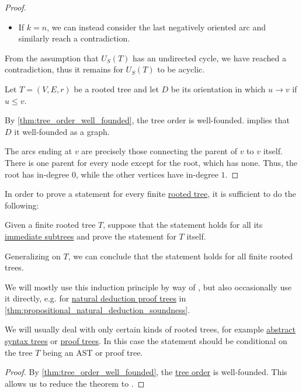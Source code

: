 \begin{proof}
\begin{itemize}
    \item If \( k = n \), we can instead consider the last negatively oriented arc and similarly reach a contradiction.
  \end{itemize}

  From the assumption that \( U_S(T) \) has an undirected cycle, we have reached a contradiction, thus it remains for \( U_S(T) \) to be acyclic.

   Let \( T = (V, E, r) \) be a rooted tree and let \( D \) be its orientation in which \( u \to v \) if \( u \leq v \).

   By \cref{thm:tree_order_well_founded}, the tree order is well-founded.  implies that \( D \) it well-founded as a graph.

   The arcs ending at \( v \) are precisely those connecting the parent of \( v \) to \( v \) itself. There is one parent for every node except for the root, which has none. Thus, the root has in-degree \( 0 \), while the other vertices have in-degree \( 1 \).
\end{proof}

\begin{theorem}\label{thm:induction_on_rooted_trees}
  In order to prove a statement for every finite \hyperref[def:rooted_tree]{rooted tree}, it is sufficient to do the following:
  \begin{displayquote}
    Given a finite rooted tree \( T \), suppose that the statement holds for all its \hyperref[def:rooted_tree/subtree]{immediate subtrees} and prove the statement for \( T \) itself.
  \end{displayquote}

  Generalizing on \( T \), we can conclude that the statement holds for all finite rooted trees.
\end{theorem}
\begin{comments}
  \item We will mostly use this induction principle by way of , but also occasionally use it directly, e.g. for \hyperref[def:propositional_natural_deduction_proof_tree]{natural deduction proof trees} in \cref{thm:propositional_natural_deduction_soundness}.

  \item We will usually deal with only certain kinds of rooted trees, for example \hyperref[con:abstract_syntax_tree]{abstract syntax trees} or \hyperref[def:proof_tree]{proof trees}. In this case the statement should be conditional on the tree \( T \) being an AST or proof tree.
\end{comments}
\begin{proof}
  By \cref{thm:tree_order_well_founded}, the \hyperref[def:rooted_tree]{tree order} is well-founded. This allows us to reduce the theorem to .
\end{proof}


